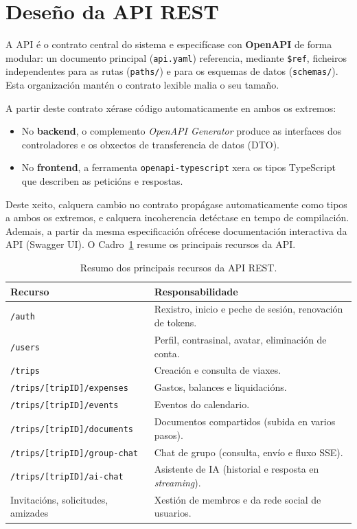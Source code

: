\section{Deseño da API REST}

A API é o contrato central do sistema e especifícase con \textbf{OpenAPI} de forma
modular: un documento principal (\texttt{api.yaml}) referencia, mediante \texttt{\$ref},
ficheiros independentes para as rutas (\texttt{paths/}) e para os esquemas de datos
(\texttt{schemas/}). Esta organización mantén o contrato lexible malia o seu tamaño.

A partir deste contrato xérase código automaticamente en ambos os extremos:

\begin{itemize}
  \item No \textbf{backend}, o complemento \textit{OpenAPI Generator} produce as
        interfaces dos controladores e os obxectos de transferencia de datos (DTO).
  \item No \textbf{frontend}, a ferramenta \texttt{openapi-typescript} xera os tipos
        TypeScript que describen as peticións e respostas.
\end{itemize}

Deste xeito, calquera cambio no contrato propágase automaticamente como tipos a ambos os
extremos, e calquera incoherencia detéctase en tempo de compilación. Ademais, a partir
da mesma especificación ofrécese documentación interactiva da API (Swagger UI). O
Cadro~\ref{tab:recursos} resume os principais recursos da API.

\begin{table}[H]
  \caption{Resumo dos principais recursos da API REST.}
  \label{tab:recursos}
  \centering
  \begin{tabularx}{\textwidth}{@{}lX@{}}
    \toprule
    \textbf{Recurso} & \textbf{Responsabilidade} \\
    \midrule
    \texttt{/auth}                    & Rexistro, inicio e peche de sesión, renovación de tokens. \\
    \texttt{/users}                   & Perfil, contrasinal, avatar, eliminación de conta. \\
    \texttt{/trips}                   & Creación e consulta de viaxes. \\
    \texttt{/trips/[tripID]/expenses}      & Gastos, balances e liquidacións. \\
    \texttt{/trips/[tripID]/events}        & Eventos do calendario. \\
    \texttt{/trips/[tripID]/documents}     & Documentos compartidos (subida en varios pasos). \\
    \texttt{/trips/[tripID]/group-chat}    & Chat de grupo (consulta, envío e fluxo SSE). \\
    \texttt{/trips/[tripID]/ai-chat}       & Asistente de IA (historial e resposta en \textit{streaming}). \\
    Invitacións, solicitudes, amizades & Xestión de membros e da rede social de usuarios. \\
    \bottomrule
  \end{tabularx}
\end{table}

